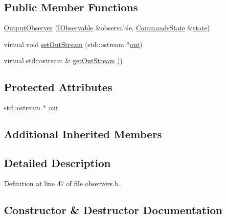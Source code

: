 \subsection*{Public Member Functions}
\begin{DoxyCompactItemize}
\item 
\hyperlink{struct_output_observer_a4052d1e6dc1982c34d2d16096e07907d}{Output\+Observer} (\hyperlink{struct_i_observable}{I\+Observable} \&observable, \hyperlink{class_commands_state}{Commands\+State} \&\hyperlink{struct_observer_base_a107ad54040309605fa5fafd481b97f2f}{state})
\item 
virtual void \hyperlink{struct_output_observer_ad570c99b8a3d989e79d3e9da84cf1db3}{set\+Out\+Stream} (std\+::ostream $\ast$\hyperlink{struct_output_observer_a64538320bd2f95c23e7d5d5315aeae7d}{out})
\item 
virtual std\+::ostream \& \hyperlink{struct_output_observer_a6a89f9b1dbe4781dd3246f751b73756e}{get\+Out\+Stream} ()
\end{DoxyCompactItemize}
\subsection*{Protected Attributes}
\begin{DoxyCompactItemize}
\item 
std\+::ostream $\ast$ \hyperlink{struct_output_observer_a64538320bd2f95c23e7d5d5315aeae7d}{out}
\end{DoxyCompactItemize}
\subsection*{Additional Inherited Members}


\subsection{Detailed Description}


Definition at line 47 of file observers.\+h.



\subsection{Constructor \& Destructor Documentation}
